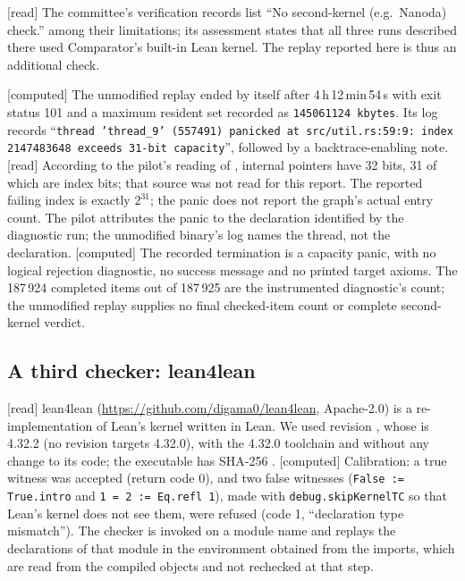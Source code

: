 \documentclass[11pt,a4paper]{article}
\theoremstyle{plain}
\theoremstyle{definition}
\theoremstyle{remark}
\numberwithin{equation}{section}
\newcommand{\st}[1]{\textsf{[#1]}}
\begin{document}
\st{read} The committee's verification records list ``No second-kernel (e.g.\ Nanoda) check.'' among their
limitations; its assessment states that all three runs described there used Comparator's built-in Lean kernel. The replay reported
here is thus an additional check.

\st{computed} The unmodified replay ended by itself after 4\,h\,12\,min\,54\,s with exit status 101 and a maximum
resident set recorded as \texttt{145061124 kbytes}. Its log records ``\texttt{thread 'thread\_9' (557491) panicked at src/util.rs:59:9:
index 2147483648 exceeds 31-bit capacity}'', followed by a backtrace-enabling note.
\st{read} According to the pilot's reading of , internal pointers have 32 bits,
31 of which are index bits; that source was not read for this report. The reported failing index is exactly
$2^{31}$; the panic does not report the graph's actual entry count.
The pilot attributes the panic to the declaration identified by the diagnostic run; the unmodified binary's log
names the thread, not the declaration. \st{computed} The recorded termination is a capacity panic, with no logical
rejection diagnostic, no success message and no printed target axioms. The 187\,924 completed items out of
187\,925 are the instrumented diagnostic's count; the unmodified replay supplies no final checked-item count
or complete second-kernel verdict.

\subsection{A third checker: lean4lean}\label{sec:l4l}

\st{read} lean4lean (\url{https://github.com/digama0/lean4lean}, Apache-2.0) is a re-implementation of Lean's kernel written in
Lean. We used revision , whose  is 4.32.2 (no revision targets
4.32.0), with the 4.32.0 toolchain and without any change to its code; the executable has SHA-256
. \st{computed} Calibration: a true witness was
accepted (return code 0), and two false witnesses (\texttt{False := True.intro} and \texttt{1 = 2 := Eq.refl 1}), made with
\texttt{debug.skipKernelTC} so that Lean's kernel does not see them, were refused (code 1, ``declaration type mismatch'').
The checker is invoked on a module name and replays the declarations of that module in the environment obtained from the
imports, which are read from the compiled objects and not rechecked at that step.
\end{document}
